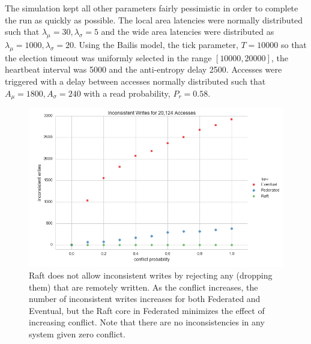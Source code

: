 \documentclass[11pt,letterpaper]{article}
\begin{document}
The simulation kept all other parameters fairly pessimistic in order to complete the run as quickly as possible. The local area latencies were normally distributed such that $\lambda_{\mu}=30, \lambda_{\sigma}=5$ and the wide area latencies were distributed as $\lambda_{\mu}=1000, \lambda_{\sigma}=20$. Using the Bailis model, the tick parameter, $T = 10000$ so that the election timeout was uniformly selected in the range $[10000, 20000]$, the heartbeat interval was 5000 and the anti-entropy delay 2500. Accesses were triggered with a delay between accesses normally distributed such that $A_{\mu}=1800, A_{\sigma}=240$ with a read probability, $P_r=0.58$.

\begin{figure}[!h]
    \centering
        \includegraphics[width=\textwidth]{figures/inconsistent_writes.png}
        \caption{\textsf{Raft does not allow inconsistent writes by rejecting any (dropping them) that are remotely written. As the conflict increases, the number of inconsistent writes increases for both Federated and Eventual, but the Raft core in Federated minimizes the effect of increasing conflict. Note that there are no inconsistencies in any system given zero conflict.}}
        \label{fig:inconsistent_writes}
\end{figure}
\end{document}
